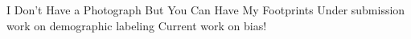 
I Don’t Have a Photograph But You Can Have My Footprints
Under submission work on demographic labeling
Current work on bias!
